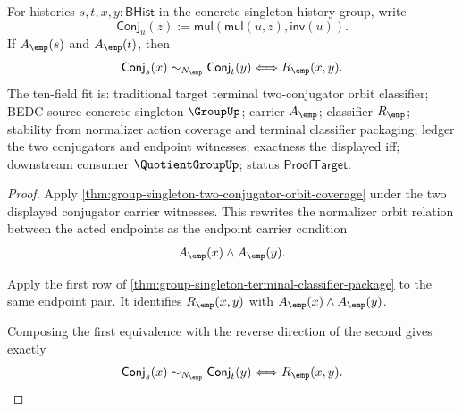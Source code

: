 \begin{theorem}
\label{thm:group-singleton-two-conjugator-orbit-classifier}
For histories $s,t,x,y:\mathsf{BHist}$ in the concrete singleton history group,
write
$$
\mathsf{Conj}_u(z):=\mathsf{mul}(\mathsf{mul}(u,z),\mathsf{inv}(u)).
$$
If $A_{\emp}(s)$ and $A_{\emp}(t)$, then
$$
\mathsf{Conj}_s(x)\sim_{N_{\emp}}\mathsf{Conj}_t(y)
\Longleftrightarrow R_{\emp}(x,y).
$$
The ten-field fit is: traditional target terminal two-conjugator orbit
classifier; BEDC source concrete singleton $\GroupUp$; carrier $A_{\emp}$;
classifier $R_{\emp}$; stability from normalizer action coverage and terminal
classifier packaging; ledger the two conjugators and endpoint witnesses;
exactness the displayed iff; downstream consumer $\QuotientGroupUp$; status
$\mathsf{ProofTarget}$.
\end{theorem}
\begin{proof}
Apply \autoref{thm:group-singleton-two-conjugator-orbit-coverage} under the
two displayed conjugator carrier witnesses. This rewrites the normalizer orbit
relation between the acted endpoints as the endpoint carrier condition
$$
A_{\emp}(x)\land A_{\emp}(y).
$$

Apply the first row of
\autoref{thm:group-singleton-terminal-classifier-package} to the same endpoint
pair. It identifies $R_{\emp}(x,y)$ with
$A_{\emp}(x)\land A_{\emp}(y)$.

Composing the first equivalence with the reverse direction of the second gives
exactly
$$
\mathsf{Conj}_s(x)\sim_{N_{\emp}}\mathsf{Conj}_t(y)
\Longleftrightarrow R_{\emp}(x,y).
$$
\end{proof}

